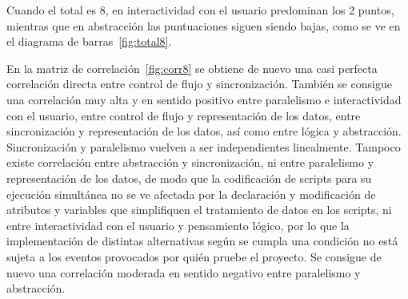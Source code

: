 \documentclass[a4paper, 12pt]{book}
\begin{document}
Cuando el total es 8, en interactividad con el usuario predominan los 2 puntos, mientras que en abstracción las puntuaciones siguen siendo bajas, como se ve en el diagrama de barras~\ref{fig:total8}.

En la matriz de correlación~\ref{fig:corr8} se obtiene de nuevo una casi perfecta correlación directa entre control de flujo y sincronización. También se consigue una correlación muy alta y en sentido positivo entre paralelismo e interactividad con el usuario, entre control de flujo y representación de los datos, entre sincronización y representación de los datos, así como entre lógica y abstracción. Sincronización y paralelismo vuelven a ser independientes linealmente. Tampoco existe correlación entre abstracción y sincronización, ni entre paralelismo y representación de los datos, de modo que la codificación de scripts para su ejecución simultánea no se ve afectada por la declaración y modificación de atributos y variables que simplifiquen el tratamiento de datos en los scripts, ni entre  interactividad con el usuario y pensamiento lógico, por lo que la implementación de distintas alternativas según se cumpla una condición no está sujeta a los eventos provocados por quién pruebe el proyecto. Se consigue de nuevo una correlación moderada en sentido negativo entre paralelismo y abstracción.%
\end{document}
